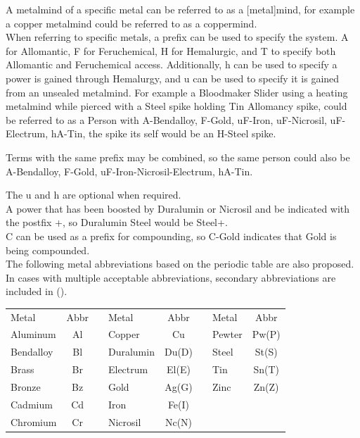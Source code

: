 \documentclass[conference]{IEEEtran}
\newcommand{\n}{\hfill\break}
\begin{document}
A metalmind of a specific metal can be referred to as a [metal]mind, for example a copper metalmind could be referred to as a coppermind.\\

When referring to specific metals, a prefix can be used to specify the system.  A for Allomantic, F for Feruchemical, H for Hemalurgic, and T to specify both Allomantic and Feruchemical access.  Additionally, h can be used to specify a power is gained through Hemalurgy, and u can be used to specify it is gained from an unsealed metalmind.  For example a Bloodmaker Slider using a heating metalmind while pierced with a Steel spike holding Tin Allomancy spike, could be referred to as a Person with A-Bendalloy, F-Gold, uF-Iron, uF-Nicrosil, uF-Electrum, hA-Tin, the spike its self would be an H-Steel spike.  

Terms with the same prefix may be combined, so the same person could also be A-Bendalloy, F-Gold, uF-Iron-Nicrosil-Electrum, hA-Tin.  

	
	


The u and h are optional when required.\\

A power that has been boosted by Duralumin or Nicrosil and be indicated with the postfix +, so Duralumin Steel would be Steel+. \\

C can be used as a prefix for compounding, so C-Gold indicates that Gold is being compounded.\\

The following metal abbreviations based on the periodic table are also proposed.  In cases with multiple acceptable abbreviations, secondary abbreviations are included in ().\\\n
\setlength{\tabcolsep}{.5\tabcolsep}
\begin{tabular}{|l |c |c|l |c |c|l |c | }
	
	\cline{1-2}\cline{4-5}\cline{7-8}
	Metal&Abbr&&Metal&Abbr&&Metal&Abbr\\
	\cline{1-2}\cline{4-5}\cline{7-8}
	
	\cline{1-2}\cline{4-5}\cline{7-8}
	Aluminum & Al&&  Copper & Cu && 	Pewter & Pw(P) \\ 
	\cline{1-2}\cline{4-5}\cline{7-8}
	Bendalloy & Bl && Duralumin &Du(D) &&  	Steel & St(S)\\
	\cline{1-2}\cline{4-5}\cline{7-8}
	Brass & Br && Electrum& El(E) &&  Tin & Sn(T)\\
	\cline{1-2}\cline{4-5}\cline{7-8}
	Bronze & Bz &&	Gold&Ag(G)  &&Zinc & Zn(Z)  \\
	\cline{1-2}\cline{4-5}\cline{7-8}
Cadmium & Cd&&	Iron & Fe(I)  \\
	\cline{1-2}\cline{4-5}
	Chromium &Cr&& Nicrosil & Nc(N) \\
	\cline{1-2}\cline{4-5}
\end{tabular}\\
\end{document}
